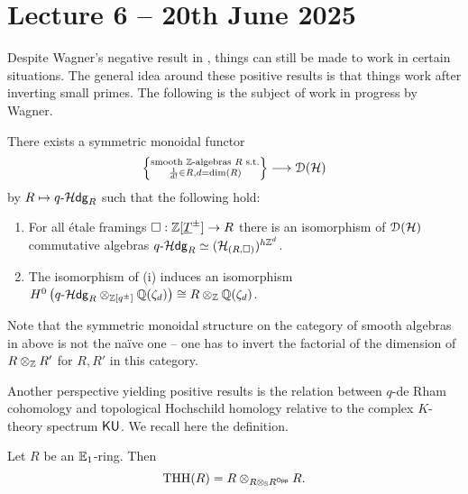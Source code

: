 \section{Lecture 6 -- 20th June 2025}\label{sec: lecture 6}
Despite Wagner's negative result in , things can still be made to work in certain situations. The general idea around these positive results is that things work after inverting small primes. The following is the subject of work in progress by Wagner. 
\begin{conjecture}[Wagner]\label{conj: Wagner primes up to dimension inverted}
    There exists a symmetric monoidal functor 
    $$\left\{\substack{\textrm{smooth }\mathbb{Z}\textrm{-algebras }R\textrm{ s.t.} \\ \frac{1}{d!}\in R, d=\dim(R)}\right\}\longrightarrow\EuScript{D}(\mathcal{H})$$
    by $R\mapsto q\text{-}\mathcal{H}\mathsf{dg}_{R}$ such that the following hold:
    \begin{enumerate}[label=(\roman*)]
        \item For all \'{e}tale framings $\square:\mathbb{Z}[\underline{T}^{\pm}]\to R$ there is an isomorphism of $\EuScript{D}(\mathcal{H})$ commutative algebras $q\text{-}\mathcal{H}\mathsf{dg}_{R}\simeq(\mathcal{H}_{(R,\square)})^{h\mathbb{Z}^{d}}$. 
        \item The isomorphism of (i) induces an isomorphism $H^{0}\left(q\text{-}\mathcal{H}\mathsf{dg}_{R}\otimes_{\mathbb{Z}[q^{\pm}]}\mathbb{Q}(\zeta_{d})\right)\cong R\otimes_{\mathbb{Z}}\mathbb{Q}(\zeta_{d})$. 
    \end{enumerate}
\end{conjecture}
\begin{remark}
    Note that the symmetric monoidal structure on the category of smooth algebras in  above is not the na\"{i}ve one -- one has to invert the factorial of the dimension of $R\otimes_{\mathbb{Z}}R'$ for $R,R'$ in this category. 
\end{remark}
Another perspective yielding positive results is the relation between $q$-de Rham cohomology and topological Hochschild homology relative to the complex $K$-theory spectrum $\mathsf{KU}$. We recall here the definition. 
\begin{definition}\label{def: THH}
    Let $R$ be an $\mathbb{E}_{1}$-ring. Then 
    $$\mathrm{THH}(R)=R\otimes_{R\otimes_{\mathbb{S}}R^{\mathsf{Opp}}}R.$$
\end{definition}
